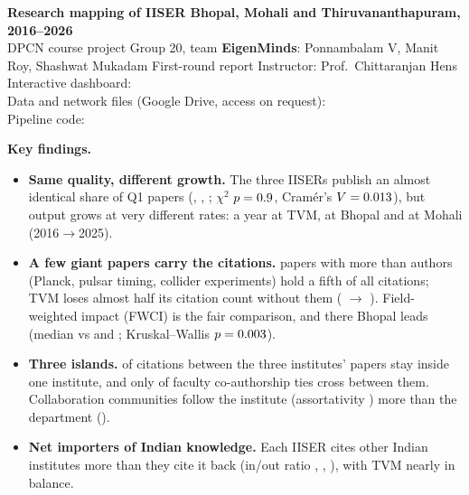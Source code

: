 \documentclass[10pt,a4paper]{article}
\begin{document}
\noindent\begin{minipage}[t]{0.86\linewidth}
{\color{plum}\Large\bfseries Research mapping of IISER Bhopal, Mohali and Thiruvananthapuram, 2016--2026}\\[2pt]
{\color{muted}DPCN course project \textbullet{} Group 20, team \textbf{EigenMinds}: Ponnambalam V, Manit Roy, Shashwat Mukadam \textbullet{} First-round report \textbullet{} Instructor: Prof.\ Chittaranjan Hens}\\[2pt]
{\small Interactive dashboard: \DashURL\\ Data and network files (Google Drive, access on request): \DriveURL\\ Pipeline code: \RepoURL}
\end{minipage}\hfill
\begin{minipage}[t]{0.12\linewidth}\vspace{0pt}\raggedleft
\QRBlock
\end{minipage}

\vspace{4pt}
\noindent\colorbox{plum!7}{\begin{minipage}{\dimexpr\linewidth-2\fboxsep}
\small\textbf{Key findings.}
\begin{itemize}
\item \textbf{Same quality, different growth.} The three IISERs publish an almost identical share of Q1 papers (\QOneB, \QOneM, \QOneT; $\chi^2$ $p=0.9$, Cram\'er's $V=0.013$), but output grows at very different rates: \CAGRT{} a year at TVM, \CAGRB{} at Bhopal and \CAGRM{} at Mohali (2016$\to$2025).
\item \textbf{A few giant papers carry the citations.} \HypAll{} papers with more than \HyperCap{} authors (Planck, pulsar timing, collider experiments) hold a fifth of all citations; TVM loses almost half its citation count without them (\CitT{} $\to$ \CitNoHypT). Field-weighted impact (FWCI) is the fair comparison, and there Bhopal leads (median \FWCIB{} vs \FWCIM{} and \FWCIT; Kruskal--Wallis $p=0.003$).
\item \textbf{Three islands.} \CSelf{} of citations between the three institutes' papers stay inside one institute, and only \ACross{} of \AEdges{} faculty co-authorship ties cross between them. Collaboration communities follow the institute (assortativity \AAssInst) more than the department (\AAssDept).
\item \textbf{Net importers of Indian knowledge.} Each IISER cites other Indian institutes more than they cite it back (in/out ratio \RatioB, \RatioM, \RatioT), with TVM nearly in balance.
\end{itemize}
\end{minipage}}
\end{document}
